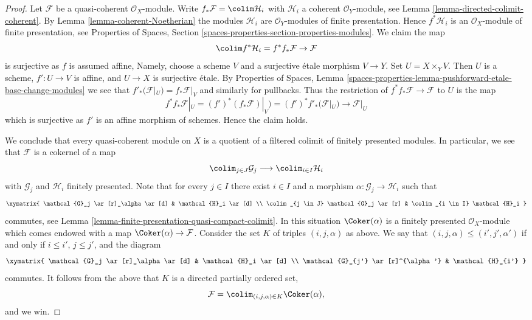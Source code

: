 \begin{proof}
Let $\mathcal{F}$ be a quasi-coherent $\mathcal{O}_X$-module.
Write $f_*\mathcal{F} = \colim \mathcal{H}_i$ with $\mathcal{H}_i$
a coherent $\mathcal{O}_Y$-module, see
Lemma \ref{lemma-directed-colimit-coherent}.
By Lemma \ref{lemma-coherent-Noetherian} the modules $\mathcal{H}_i$
are $\mathcal{O}_Y$-modules of finite presentation. Hence
$f^*\mathcal{H}_i$ is an $\mathcal{O}_X$-module of finite presentation, see
Properties of Spaces, Section
\ref{spaces-properties-section-properties-modules}.
We claim the map
$$
\colim f^*\mathcal{H}_i = f^*f_*\mathcal{F} \to \mathcal{F}
$$
is surjective as $f$ is assumed affine, Namely, choose
a scheme $V$ and a surjective \'etale morphism $V \to Y$. Set
$U = X \times_Y V$. Then $U$ is a scheme, $f' : U \to V$ is affine, and
$U \to X$ is surjective \'etale. By
Properties of Spaces, Lemma
\ref{spaces-properties-lemma-pushforward-etale-base-change-modules}
we see that $f'_*(\mathcal{F}|_U) = f_*\mathcal{F}|_V$ and similarly
for pullbacks. Thus the restriction of $f^*f_*\mathcal{F} \to \mathcal{F}$
to $U$ is the map
$$
f^*f_*\mathcal{F}|_U = (f')^*(f_*\mathcal{F})|_V) =
(f')^*f'_*(\mathcal{F}|_U) \to \mathcal{F}|_U
$$
which is surjective as $f'$ is an affine morphism of schemes.
Hence the claim holds.

\medskip\noindent
We conclude that every quasi-coherent module on $X$ is a quotient of a
filtered colimit of finitely presented modules. In particular, we see that
$\mathcal{F}$ is a cokernel of a map
$$
\colim_{j \in J} \mathcal{G}_j \longrightarrow \colim_{i \in I} \mathcal{H}_i
$$
with $\mathcal{G}_j$ and $\mathcal{H}_i$ finitely presented. Note
that for every $j \in I$ there exist $i \in I$ and a morphism
$\alpha : \mathcal{G}_j \to \mathcal{H}_i$ such that
$$
\xymatrix{
\mathcal{G}_j \ar[r]_\alpha \ar[d] & \mathcal{H}_i \ar[d] \\
\colim_{j \in J} \mathcal{G}_j \ar[r] &
\colim_{i \in I} \mathcal{H}_i
}
$$
commutes, see
Lemma \ref{lemma-finite-presentation-quasi-compact-colimit}.
In this situation $\Coker(\alpha)$ is a finitely presented
$\mathcal{O}_X$-module which comes endowed with a map
$\Coker(\alpha) \to \mathcal{F}$. Consider the set $K$ of
triples $(i, j, \alpha)$ as above. We say that
$(i, j, \alpha) \leq (i', j', \alpha')$ if and only if
$i \leq i'$, $j \leq j'$, and the diagram
$$
\xymatrix{
\mathcal{G}_j \ar[r]_\alpha \ar[d] & \mathcal{H}_i \ar[d] \\
\mathcal{G}_{j'} \ar[r]^{\alpha'} &
\mathcal{H}_{i'}
}
$$
commutes. It follows from the above that $K$ is
a directed partially ordered set,
$$
\mathcal{F} = \colim_{(i, j, \alpha) \in K} \Coker(\alpha),
$$
and we win.
\end{proof}






